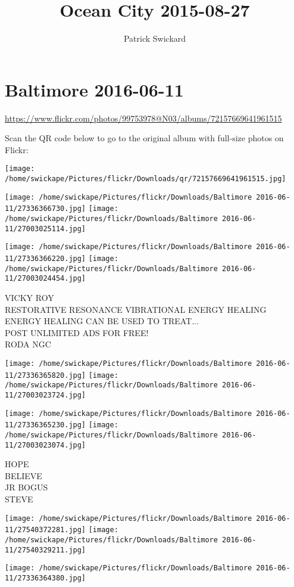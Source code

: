 \documentclass[10pt,letterpaper]{article}
\title{Ocean City 2015-08-27}
\author{Patrick Swickard}
\date{}
\begin{document}
\section*{Baltimore 2016-06-11}

\url{https://www.flickr.com/photos/99753978@N03/albums/72157669641961515}

Scan the QR code below to go to the original album with full-size photos on Flickr:

\texttt{[image: /home/swickape/Pictures/flickr/Downloads/qr/72157669641961515.jpg]}
\pagebreak

\texttt{[image: /home/swickape/Pictures/flickr/Downloads/Baltimore 2016-06-11/27336366730.jpg]}
\texttt{[image: /home/swickape/Pictures/flickr/Downloads/Baltimore 2016-06-11/27003025114.jpg]}

\texttt{[image: /home/swickape/Pictures/flickr/Downloads/Baltimore 2016-06-11/27336366220.jpg]}
\texttt{[image: /home/swickape/Pictures/flickr/Downloads/Baltimore 2016-06-11/27003024454.jpg]}

VICKY ROY\\
RESTORATIVE RESONANCE VIBRATIONAL ENERGY HEALING ENERGY HEALING CAN BE USED TO TREAT...\\
POST UNLIMITED ADS FOR FREE!\\
RODA NGC
\pagebreak

\texttt{[image: /home/swickape/Pictures/flickr/Downloads/Baltimore 2016-06-11/27336365820.jpg]}
\texttt{[image: /home/swickape/Pictures/flickr/Downloads/Baltimore 2016-06-11/27003023724.jpg]}

\texttt{[image: /home/swickape/Pictures/flickr/Downloads/Baltimore 2016-06-11/27336365230.jpg]}
\texttt{[image: /home/swickape/Pictures/flickr/Downloads/Baltimore 2016-06-11/27003023074.jpg]}

HOPE\\
BELIEVE\\
JR BOGUS\\
STEVE
\pagebreak

\texttt{[image: /home/swickape/Pictures/flickr/Downloads/Baltimore 2016-06-11/27540372281.jpg]}
\texttt{[image: /home/swickape/Pictures/flickr/Downloads/Baltimore 2016-06-11/27540329211.jpg]}

\texttt{[image: /home/swickape/Pictures/flickr/Downloads/Baltimore 2016-06-11/27336364380.jpg]}
\end{document}
